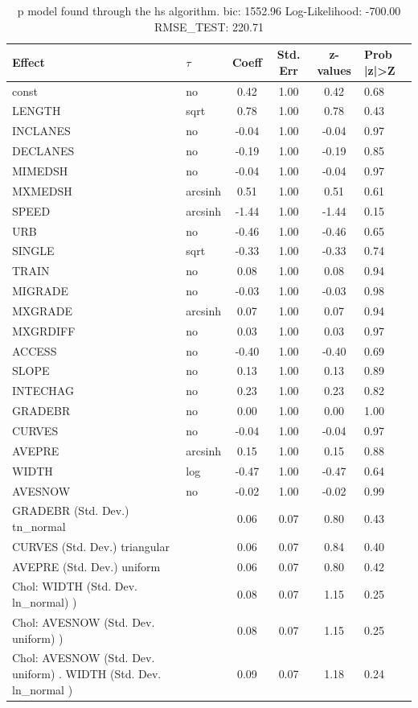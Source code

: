 \begin{table}
	\caption{p model found through the hs algorithm. bic: 1552.96 Log-Likelihood: -700.00 RMSE_TEST: 220.71}
	\begin{center}
		\begin{tabular}{|l|l|c|c|c|l|}
			\hline
			Effect & $\tau$ & Coeff & Std. Err & z-values & Prob |z|>Z \\
			\hline
			const & no & 0.42 & 1.00 & 0.42 & 0.68 \\
			\hline
			LENGTH & sqrt & 0.78 & 1.00 & 0.78 & 0.43 \\
			\hline
			INCLANES & no & -0.04 & 1.00 & -0.04 & 0.97 \\
			\hline
			DECLANES & no & -0.19 & 1.00 & -0.19 & 0.85 \\
			\hline
			MIMEDSH & no & -0.04 & 1.00 & -0.04 & 0.97 \\
			\hline
			MXMEDSH & arcsinh & 0.51 & 1.00 & 0.51 & 0.61 \\
			\hline
			SPEED & arcsinh & -1.44 & 1.00 & -1.44 & 0.15 \\
			\hline
			URB & no & -0.46 & 1.00 & -0.46 & 0.65 \\
			\hline
			SINGLE & sqrt & -0.33 & 1.00 & -0.33 & 0.74 \\
			\hline
			TRAIN & no & 0.08 & 1.00 & 0.08 & 0.94 \\
			\hline
			MIGRADE & no & -0.03 & 1.00 & -0.03 & 0.98 \\
			\hline
			MXGRADE & arcsinh & 0.07 & 1.00 & 0.07 & 0.94 \\
			\hline
			MXGRDIFF & no & 0.03 & 1.00 & 0.03 & 0.97 \\
			\hline
			ACCESS & no & -0.40 & 1.00 & -0.40 & 0.69 \\
			\hline
			SLOPE & no & 0.13 & 1.00 & 0.13 & 0.89 \\
			\hline
			INTECHAG & no & 0.23 & 1.00 & 0.23 & 0.82 \\
			\hline
			GRADEBR & no & 0.00 & 1.00 & 0.00 & 1.00 \\
			\hline
			CURVES & no & -0.04 & 1.00 & -0.04 & 0.97 \\
			\hline
			AVEPRE & arcsinh & 0.15 & 1.00 & 0.15 & 0.88 \\
			\hline
			WIDTH & log & -0.47 & 1.00 & -0.47 & 0.64 \\
			\hline
			AVESNOW & no & -0.02 & 1.00 & -0.02 & 0.99 \\
			\hline
			GRADEBR (Std. Dev.) tn_normal &  & 0.06 & 0.07 & 0.80 & 0.43 \\
			\hline
			CURVES (Std. Dev.) triangular &  & 0.06 & 0.07 & 0.84 & 0.40 \\
			\hline
			AVEPRE (Std. Dev.) uniform &  & 0.06 & 0.07 & 0.80 & 0.42 \\
			\hline
			 Chol: WIDTH (Std. Dev. ln_normal) ) &  & 0.08 & 0.07 & 1.15 & 0.25 \\
			\hline
			 Chol: AVESNOW (Std. Dev. uniform) ) &  & 0.08 & 0.07 & 1.15 & 0.25 \\
			\hline
			 Chol: AVESNOW (Std. Dev. uniform) . WIDTH (Std. Dev.   ln_normal ) &  & 0.09 & 0.07 & 1.18 & 0.24 \\
			\hline
		\end{tabular}
	\end{center}
\end{table}